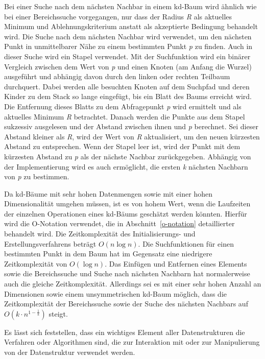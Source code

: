 Bei einer Suche nach dem nächsten Nachbar in einem kd-Baum wird ähnlich wie bei einer Bereichssuche vorgegangen, nur dass der Radius \textit{R} als aktuelles Minimum und Ablehnungskriterium anstatt als akzeptierte Bedingung behandelt wird. Die Suche nach dem nächsten Nachbar wird verwendet, um den nächsten Punkt in unmittelbarer Nähe zu einem bestimmten Punkt \textit{p} zu finden. Auch in dieser Suche wird ein Stapel verwendet. Mit der Suchfunktion wird ein binärer Vergleich zwischen dem Wert von \textit{p} und einen Knoten (am Anfang die Wurzel) ausgeführt und abhängig davon durch den linken oder rechten Teilbaum durchquert. Dabei werden alle besuchten Knoten auf dem Suchpfad und deren Kinder zu dem Stack so lange eingefügt, bis ein Blatt des Baums erreicht wird. Die Entfernung dieses Blatts zu dem Abfragepunkt \textit{p} wird ermittelt und als aktuelles Minimum \textit{R} betrachtet. Danach werden die Punkte aus dem Stapel sukzessiv ausgelesen und der Abstand zwischen ihnen und \textit{p} berechnet. Sei dieser Abstand kleiner als \textit{R}, wird der Wert von \textit{R} aktualisiert, um den neuen kürzesten Abstand zu entsprechen. Wenn der Stapel leer ist, wird der Punkt mit dem kürzesten Abstand zu \textit{p} als der nächste Nachbar zurückgegeben. Abhängig von der Implementierung wird es auch ermöglicht, die ersten \textit{k} nächsten Nachbarn von \textit{p} zu bestimmen. \autocite[96]{saha_advanced_2019}

Da kd-Bäume mit sehr hohen Datenmengen sowie mit einer hohen Dimensionalität umgehen müssen, ist es von hohem Wert, wenn die Laufzeiten der einzelnen Operationen eines kd-Bäums geschätzt werden könnten. Hierfür wird die O-Notation verwendet, die in Abschnitt~\ref{o-notation} detaillierter behandelt wird. Die Zeitkomplexität des Initialisierungs- und Erstellungsverfahrens beträgt $O(n\log n)$. Die Suchfunktionen für einen bestimmten Punkt in dem Baum hat im Gegensatz eine niedrigere Zeitkomplexität von $O(\log n)$. Das Einfügen und Entfernen eines Elements sowie die Bereichssuche und Suche nach nächsten Nachbarn hat normalerweise auch die gleiche Zeitkomplexität. Allerdings sei es mit einer sehr hohen Anzahl an Dimensionen sowie einem unsymmetrischen  kd-Baum möglich, dass die Zeitkomplexität der Bereichssuche sowie der Suche des nächsten Nachbars auf $O(k \cdot n^{1-\frac{1}{k}})$ steigt. \autocite[104-105]{bentley_fast_1978} \autocite[94-96]{saha_advanced_2019}

Es lässt sich feststellen, dass ein wichtiges Element aller Datenstrukturen die Verfahren oder Algorithmen sind, die zur Interaktion mit oder zur Manipulierung von der Datenstruktur verwendet werden.

